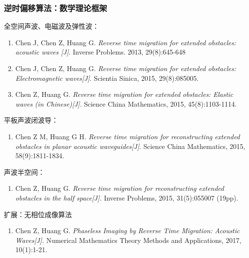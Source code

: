 \documentclass[8pt]{beamer}
\begin{document}
\begin{frame}
\frametitle{逆时偏移算法：数学理论框架}
\begin{small}
	\begin{block}{全空间声波、电磁波及弹性波：}
		\begin{enumerate}
			\item Chen J, Chen Z, Huang G. {\it Reverse time migration for extended obstacles: acoustic waves [J]}. Inverse Problems. 2013, 29(8):645-648
			\item Chen J, Chen Z, Huang G. {\it Reverse time migration for extended obstacles: Electromagnetic waves[J]}. Scientia Sinica, 2015, 29(8):085005.
			\item Chen Z, Huang G. {\it Reverse time migration for extended obstacles: Elastic waves (in Chinese)[J]}. Science China Mathematics, 2015, 45(8):1103-1114.
		\end{enumerate}
	\end{block}
	\begin{block}{平板声波闭波导：}
		\begin{enumerate}
			\item Chen Z M, Huang G H. {\it Reverse time migration for reconstructing extended obstacles in planar acoustic waveguides[J]}. Science China Mathematics, 2015, 58(9):1811-1834.
		\end{enumerate}
	\end{block}
	
	\begin{block}{声波半空间：}
		\begin{enumerate}
			\item Chen Z, Huang G. {\it Reverse time migration for reconstructing extended obstacles in the half space[J].} Inverse Problems, 2015, 31(5):055007 (19pp).
		\end{enumerate}
	\end{block}
	
	\begin{block}{扩展：无相位成像算法}
		\begin{enumerate}
			\item Chen Z, Huang G. {\it Phaseless Imaging by Reverse Time Migration: Acoustic Waves[J]. } Numerical Mathematics Theory Methods and Applications, 2017, 10(1):1-21.
		\end{enumerate}
	\end{block}
\end{small}

\end{frame}
\end{document}
